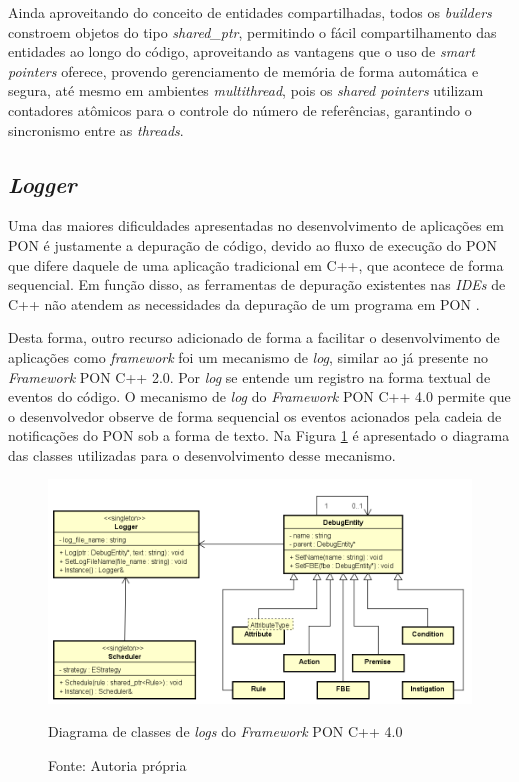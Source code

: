 Ainda aproveitando do conceito de entidades compartilhadas, todos os
\textit{builders} constroem objetos do tipo \textit{shared\_ptr}, permitindo o
fácil compartilhamento das entidades ao longo do código, aproveitando as
vantagens que o uso de \textit{smart pointers} oferece, provendo gerenciamento
de memória de forma automática e segura, até mesmo em ambientes
\textit{multithread}, pois os \textit{shared pointers} utilizam contadores
atômicos para o controle do número de referências, garantindo o sincronismo
entre as \textit{threads}.

\subsection{\textit{Logger}}

Uma das maiores dificuldades apresentadas no desenvolvimento de aplicações em
PON é justamente a depuração de código, devido ao fluxo de execução do PON que
difere daquele de uma aplicação tradicional em C++, que acontece de forma
sequencial. Em função disso, as ferramentas de depuração existentes nas
\textit{IDEs} de C++ não atendem as necessidades da depuração de um programa em
PON \cite{msc_Ronszcka_2012}.

Desta forma, outro recurso adicionado de forma a facilitar o desenvolvimento de
aplicações como  \textit{framework} foi um mecanismo de \textit{log}, similar ao
já presente no \textit{Framework} PON C++ 2.0. Por \textit{log} se entende um
registro na forma textual de eventos do código. O mecanismo de \textit{log} do
\textit{Framework} PON C++ 4.0 permite que o desenvolvedor observe de forma
sequencial os eventos acionados pela cadeia de notificações do PON sob a forma
de texto. Na Figura \ref{fig:class_fw4_log} é apresentado o diagrama das classes
utilizadas para o desenvolvimento desse mecanismo.

\begin{figure}[!htb]
    \centering
    \includegraphics[width=\textwidth]{../figures/logger_class.png}
    \smallskip
    \caption{Diagrama de classes de \textit{logs} do \textit{Framework} PON C++
    4.0}
    \caption*{Fonte: Autoria própria}
    \label{fig:class_fw4_log}
\end{figure}

